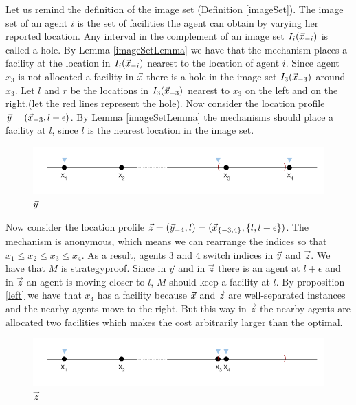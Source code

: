 Let us remind the definition of the image set (Definition \ref{imageSet}). The image set of an agent $i$ is the set of facilities the agent can obtain by varying her reported location. Any interval in the complement of an image set $I_i(\vec{x}_{-i})$ is called a hole. By Lemma \ref{imageSetLemma} we have that the mechanism places a facility at the location in $I_i(\vec{x}_{-i})$ nearest to the location of agent $i$. Since agent $x_3$ is not allocated a facility in $\vec{x}$ there is a hole in the image set $I_3(\vec{x}_{-3})$ around $x_3$. Let $l$ and $r$ be the locations in $I_3(\vec{x}_{-3})$ nearest to $x_3$ on the left and on the right.(let the red lines represent the hole). Now consider the location profile $\vec{y} = (\vec{x}_{-3}, l+\epsilon)$. By Lemma \ref{imageSetLemma} the mechanisms should place a facility at $l$, since $l$ is the nearest location in the image set.


\begin{figure}[ht]
    \centering
    \includegraphics[width=12cm]{Images/imposibility2.png}
    \caption{$\vec{y}$}
    \label{fig:imp2}
\end{figure}

Now consider the location profile $\vec{z}=(\vec{y}_{-4},l)= (\vec{x}_{\{-3,4\}},\{l,l+\epsilon\})$. The mechanism is anonymous, which means we can rearrange the indices so that $x_1\le x_2 \le x_3\le x_4$. As a result, agents 3 and 4 switch indices in $\vec{y}$ and $\vec{z}$. We have that $M$ is strategyproof. Since in $\vec{y}$ and in $\vec{z}$ there is an agent at $l+\epsilon$ and in $\vec{z}$ an agent is moving closer to $l$, $M$ should keep a facility at $l$. By proposition \ref{left} we have that $x_4$ has a facility because $\vec{x}$ and $\vec{z}$ are well-separated instances and the nearby agents move to the right. But this way in $\vec{z}$ the nearby agents are allocated two facilities which makes the cost arbitrarily larger than the optimal.




\begin{figure}[ht] 
    \centering
    \includegraphics[width=12cm]{Images/imposibility3.png}
    \caption{$\vec{z}$}
    \label{fig:imp3}
\end{figure}



